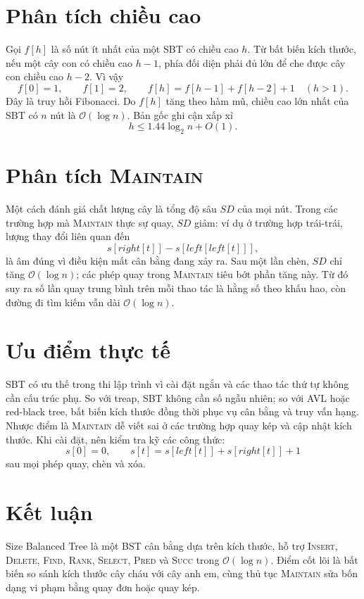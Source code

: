 \documentclass[11pt]{article}
\newcommand{\Oh}{\mathcal{O}}
\begin{document}
\section{Phân tích chiều cao}

Gọi \(f[h]\) là số nút ít nhất của một SBT có chiều cao \(h\). Từ bất biến
kích thước, nếu một cây con có chiều cao \(h-1\), phía đối diện phải đủ lớn
để che được cây con chiều cao \(h-2\). Vì vậy
\[
f[0]=1,\qquad f[1]=2,\qquad
f[h]=f[h-1]+f[h-2]+1\quad (h>1).
\]
Đây là truy hồi Fibonacci. Do \(f[h]\) tăng theo hàm mũ, chiều cao lớn nhất
của SBT có \(n\) nút là \(\Oh(\log n)\). Bản gốc ghi cận xấp xỉ
\[
  h \le 1.44\log_2 n + O(1).
\]

\section{Phân tích \textsc{Maintain}}

Một cách đánh giá chất lượng cây là tổng độ sâu \(SD\) của mọi nút. Trong
các trường hợp mà \textsc{Maintain} thực sự quay, \(SD\) giảm: ví dụ ở
trường hợp trái-trái, lượng thay đổi liên quan đến
\[
  s[\mathit{right}[t]]-s[\mathit{left}[\mathit{left}[t]]],
\]
là âm đúng vì điều kiện mất cân bằng đang xảy ra. Sau một lần chèn, \(SD\)
chỉ tăng \(\Oh(\log n)\); các phép quay trong \textsc{Maintain} tiêu bớt phần
tăng này. Từ đó suy ra số lần quay trung bình trên mỗi thao tác là hằng số
theo khấu hao, còn đường đi tìm kiếm vẫn dài \(\Oh(\log n)\).

\section{Ưu điểm thực tế}

SBT có ưu thế trong thi lập trình vì cài đặt ngắn và các thao tác thứ tự
không cần cấu trúc phụ. So với treap, SBT không cần số ngẫu nhiên; so với AVL
hoặc red-black tree, bất biến kích thước đồng thời phục vụ cân bằng và truy
vấn hạng. Nhược điểm là \textsc{Maintain} dễ viết sai ở các trường hợp quay
kép và cập nhật kích thước. Khi cài đặt, nên kiểm tra kỹ các công thức:
\[
  s[0]=0,\qquad
  s[t]=s[\mathit{left}[t]]+s[\mathit{right}[t]]+1
\]
sau mọi phép quay, chèn và xóa.

\section{Kết luận}

Size Balanced Tree là một BST cân bằng dựa trên kích thước, hỗ trợ
\textsc{Insert}, \textsc{Delete}, \textsc{Find}, \textsc{Rank},
\textsc{Select}, \textsc{Pred} và \textsc{Succ} trong \(\Oh(\log n)\). Điểm
cốt lõi là bất biến so sánh kích thước cây cháu với cây anh em, cùng thủ tục
\textsc{Maintain} sửa bốn dạng vi phạm bằng quay đơn hoặc quay kép.
\end{document}
